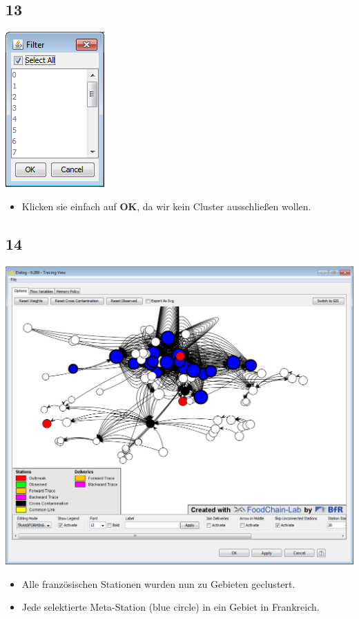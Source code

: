 \documentclass{beamer}
\begin{document}
\subsection{13}
\begin{frame}
	\begin{center}
  		\includegraphics[height=0.5\textheight]{13.png}
	\end{center}
	\begin{itemize}
		\item Klicken sie einfach auf \textbf{OK}, da wir kein Cluster ausschließen wollen.
	\end{itemize}
\end{frame}

\subsection{14}
\begin{frame}
	\begin{center}
  		\includegraphics[height=0.6\textheight]{14.png}
	\end{center}
	\begin{itemize}
		\item Alle französischen Stationen wurden nun zu Gebieten geclustert.
		\item Jede selektierte Meta-Station (blue circle) in ein Gebiet in Frankreich.		
	\end{itemize}
\end{frame}
\end{document}
